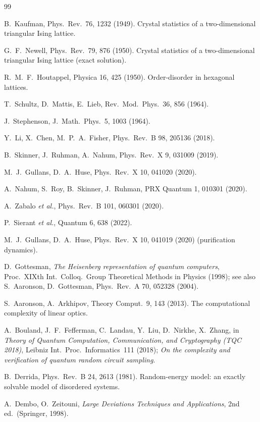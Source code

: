 \documentclass[11pt]{article}
\begin{document}

\begin{thebibliography}{99}

B.~Kaufman, Phys.\ Rev.\ 76, 1232 (1949). Crystal statistics of a
two-dimensional triangular Ising lattice.

G.~F.~Newell, Phys.\ Rev.\ 79, 876 (1950). Crystal statistics of a
two-dimensional triangular Ising lattice (exact solution).

R.~M.~F.~Houtappel, Physica 16, 425 (1950). Order-disorder in hexagonal
lattices.

T.~Schultz, D.~Mattis, E.~Lieb, Rev.\ Mod.\ Phys.\ 36, 856 (1964).

J.~Stephenson, J.\ Math.\ Phys.\ 5, 1003 (1964).

Y.~Li, X.~Chen, M.~P.~A.~Fisher, Phys.\ Rev.\ B 98, 205136 (2018).

B.~Skinner, J.~Ruhman, A.~Nahum, Phys.\ Rev.\ X 9, 031009 (2019).

M.~J.~Gullans, D.~A.~Huse, Phys.\ Rev.\ X 10, 041020 (2020).

A.~Nahum, S.~Roy, B.~Skinner, J.~Ruhman, PRX Quantum 1, 010301 (2020).

A.~Zabalo \emph{et al.}, Phys.\ Rev.\ B 101, 060301 (2020).

P.~Sierant \emph{et al.}, Quantum 6, 638 (2022).

M.~J.~Gullans, D.~A.~Huse, Phys.\ Rev.\ X 10, 041019 (2020) (purification
dynamics).

D.~Gottesman, \emph{The Heisenberg representation of quantum computers},
Proc.\ XIXth Int.\ Colloq.\ Group Theoretical Methods in Physics (1998);
see also S.\ Aaronson, D.\ Gottesman, Phys.\ Rev.\ A 70, 052328 (2004).

S.\ Aaronson, A.\ Arkhipov, Theory Comput.\ 9, 143 (2013).  The
computational complexity of linear optics.

A.~Bouland, J.~F.~Fefferman, C.~Landau, Y.~Liu, D.~Nirkhe, X.~Zhang,
in \emph{Theory of Quantum Computation, Communication, and Cryptography
(TQC 2018)}, Leibniz Int.\ Proc.\ Informatics\ 111 (2018); \emph{On the
complexity and verification of quantum random circuit sampling}.

B.~Derrida, Phys.\ Rev.\ B 24, 2613 (1981).  Random-energy model: an
exactly solvable model of disordered systems.

A.\ Dembo, O.\ Zeitouni, \emph{Large Deviations Techniques and
Applications}, 2nd ed.\ (Springer, 1998).

\end{thebibliography}
\end{document}
